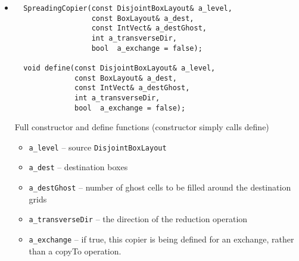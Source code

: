 \begin{itemize}

\item
\begin{verbatim}
  SpreadingCopier(const DisjointBoxLayout& a_level,
                  const BoxLayout& a_dest,
                  const IntVect& a_destGhost,
                  int a_transverseDir,
                  bool  a_exchange = false);

  void define(const DisjointBoxLayout& a_level,
              const BoxLayout& a_dest,
              const IntVect& a_destGhost,
              int a_transverseDir,
              bool  a_exchange = false);
\end{verbatim} 
Full constructor and define functions (constructor simply calls define)
\begin{itemize}
\item \verb/a_level/ -- source {\tt DisjointBoxLayout}
\item \verb/a_dest/ -- destination boxes
\item \verb/a_destGhost/ -- number of ghost cells to be filled around the
  destination grids
\item \verb/a_transverseDir/ -- the direction of the reduction
  operation
\item \verb/a_exchange/ -- if true, this copier is being defined for
  an exchange, rather than a copyTo operation.
\end{itemize}

\end{itemize}


